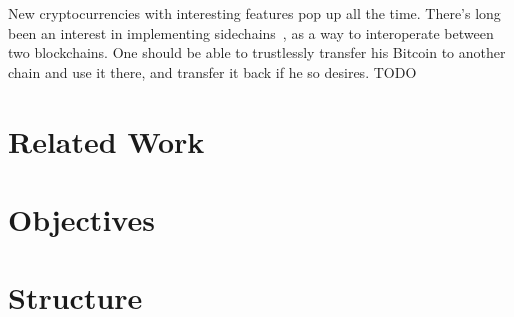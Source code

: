 New cryptocurrencies with interesting features pop up all the time. There's long been an interest in implementing sidechains~\cite{sidechains}, as a way to interoperate between two blockchains. One should be able to trustlessly transfer his Bitcoin to another chain and use it there, and transfer it back if he so desires. TODO

\section{Related Work}
\section{Objectives}
\section{Structure}
